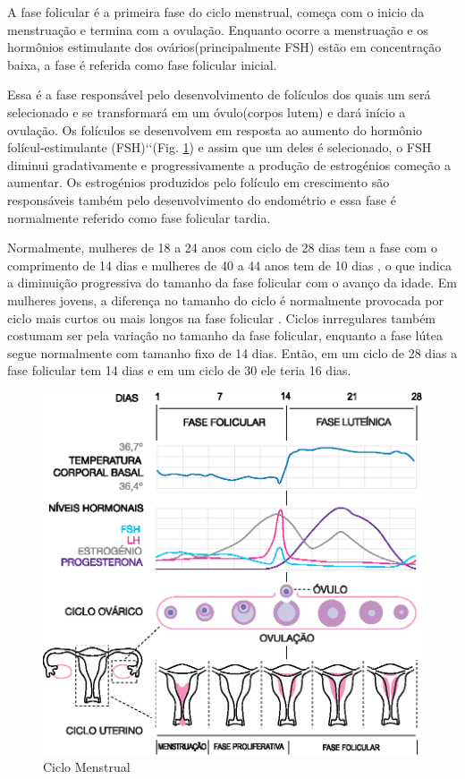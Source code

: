 A fase folicular é a primeira fase do ciclo menstrual, começa com o inicio da menstruação e termina com a ovulação. Enquanto ocorre a menstruação e os hormônios estimulante dos ovários(principalmente FSH) estão em concentração baixa, a fase é referida como fase folicular inicial\cite{lenton1984a}.

Essa é a fase responsável pelo desenvolvimento de folículos dos quais um será selecionado e se transformará em um óvulo(corpos lutem) e dará início a ovulação. Os folículos se desenvolvem em resposta ao aumento do hormônio folícul-estimulante (FSH)\lq\lq (Fig. \ref{fig01})  e assim que um deles é selecionado, o FSH diminui gradativamente e progressivamente a produção de estrogénios começão a aumentar. Os estrogénios produzidos pelo folículo em crescimento são responsáveis também pelo desenvolvimento do endométrio e essa fase é normalmente referido como fase folicular tardia.

Normalmente, mulheres de 18 a 24 anos com ciclo de 28 dias tem a fase com o comprimento de 14 dias e mulheres de 40 a 44 anos tem de 10 dias \cite{lenton1984a}, o que indica a diminuição progressiva do tamanho da fase folicular com o avanço da idade. Em mulheres jovens, a diferença no tamanho do ciclo é normalmente provocada por ciclo mais curtos ou mais longos na fase folicular \cite{lenton1984a}. Ciclos inrregulares também costumam ser pela variação no tamanho da fase folicular, enquanto a fase lútea segue normalmente com tamanho fixo de 14 dias. Então, em um ciclo de 28 dias a fase folicular tem 14 dias e em um ciclo de 30 ele teria 16 dias.

\begin{figure}[h]
	\centering
	\includegraphics[keepaspectratio=true,scale=0.8]{figuras/MenstrualCycle2_pt.eps}
	\caption{Ciclo Menstrual}
        \label{fig01}
\end{figure}

